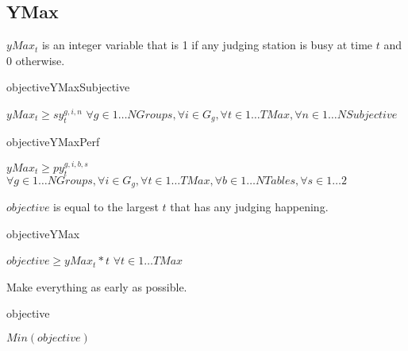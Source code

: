 \documentclass[letterpaper,11pt]{report}
\begin{document}
\FloatBarrier
\subsection{YMax}
$yMax_{t}$ is an integer variable that is 1 if any judging station is busy at
time $t$ and 0 otherwise.

\begin{algorithm}
\caption{objectiveYMaxSubjective}
$yMax_{t} \ge sy_{t}^{g,i,n}$
\hfill$
\forall g \in 1 \dots NGroups,
\forall i \in G_{g}, 
\forall t \in 1 \dots TMax,
\forall n \in 1 \dots NSubjective
$
\end{algorithm}

\begin{algorithm}
\caption{objectiveYMaxPerf}
$yMax_{t} \ge py_{t}^{g,i,b,s}$
\hfill$
\forall g \in 1 \dots NGroups,
\forall i \in G_{g}, 
\forall t \in 1 \dots TMax,
\forall b \in 1 \dots NTables,
\forall s \in 1 \dots 2
$
\end{algorithm}

\FloatBarrier
$objective$ is equal to the largest $t$ that has any judging happening.
\begin{algorithm}
\caption{objectiveYMax}
$objective \ge yMax_{t} * t$
\hfill
$\forall t \in 1 \dots TMax$
\end{algorithm}

\FloatBarrier
Make everything as early as possible.
\begin{algorithm}
\caption{objective}
$Min(objective)$
\end{algorithm}
\end{document}
